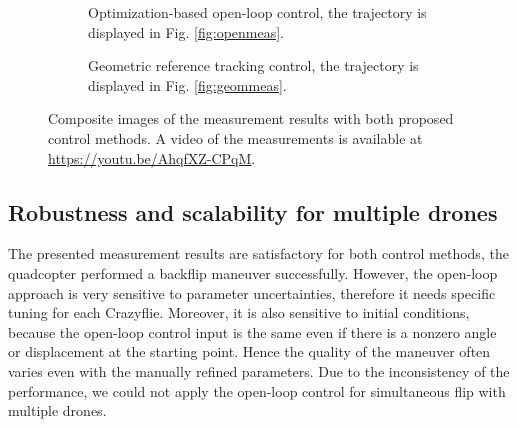 \begin{figure}
\setlength{\fboxsep}{0pt}%
\setlength{\fboxrule}{1pt}
\centering
\begin{subfigure}{.45\textwidth}
  \centering
  \caption{Optimization-based open-loop control, the trajectory is displayed in Fig. \ref{fig:openmeas}.}
  \label{fig:sub1}
\end{subfigure}%
\hspace{1cm}
\begin{subfigure}{.45\textwidth}
  \centering
  \caption{Geometric reference tracking control, the trajectory is displayed in Fig. \ref{fig:geommeas}.}
  \label{fig:sub2}
\end{subfigure}
\caption[Composite images of the measurement results]{Composite images of the measurement results with both proposed control methods. A video of the measurements is available at \url{https://youtu.be/AhqfXZ-CPqM}.}
\label{fig:test}
\end{figure}

\subsection{Robustness and scalability for multiple drones}
The presented measurement results are satisfactory for both control methods, the quadcopter performed a backflip maneuver successfully. However, the open-loop approach is very sensitive to parameter uncertainties, therefore it needs specific tuning for each Crazyflie. Moreover, it is also sensitive to initial conditions, because the open-loop control input is the same even if there is a nonzero angle or displacement at the starting point. Hence the quality of the maneuver often varies even with the manually refined parameters. Due to the inconsistency of the performance, we could not apply the open-loop control for simultaneous flip with multiple drones.

